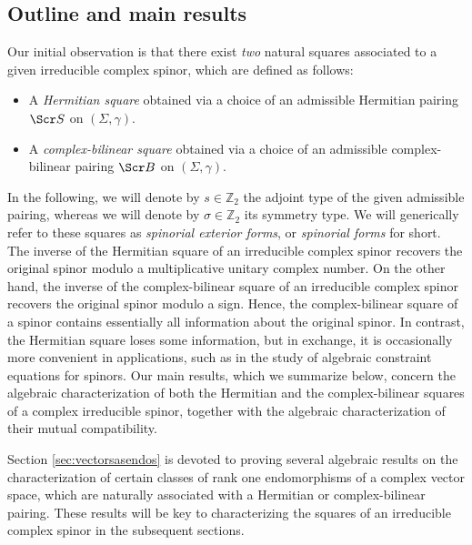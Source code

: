 \documentclass[10pt,a4paper,twoside,reqno]{amsart}
\theoremstyle{plain}
\theoremstyle{definition}
\theoremstyle{remark}
\def\scB{\Scr B}
\def\scS{\Scr S}
\begin{document}

\subsection*{Outline and main results}


Our initial observation is that there exist \emph{two} natural squares associated to a given irreducible complex spinor, which are defined as follows:
\begin{itemize}
\item A \emph{Hermitian square} obtained via a choice of an admissible Hermitian pairing $\scS$ on $(\Sigma,\gamma)$.
\item A \emph{complex-bilinear square} obtained via a choice of an admissible complex-bilinear pairing $\scB$ on $(\Sigma,\gamma)$.
\end{itemize}

\noindent
In the following, we will denote by $s\in \mathbb{Z}_2$ the adjoint type of the given admissible pairing, whereas we will denote by $\sigma\in \mathbb{Z}_2$ its symmetry type. We will generically refer to these squares as \emph{spinorial exterior forms}, or \emph{spinorial forms} for short. The inverse of the Hermitian square of an irreducible complex spinor recovers the original spinor modulo a multiplicative unitary complex number. On the other hand, the inverse of the complex-bilinear square of an irreducible complex spinor recovers the original spinor modulo a sign. Hence, the complex-bilinear square of a spinor contains essentially all information about the original spinor. In contrast, the Hermitian square loses some information, but in exchange, it is occasionally more convenient in applications, such as in the study of algebraic constraint equations for spinors. Our main results, which we summarize below, concern the algebraic characterization of both the Hermitian and the complex-bilinear squares of a complex irreducible spinor, together with the algebraic characterization of their mutual compatibility.\medskip

Section \ref{sec:vectorsasendos} is devoted to proving several algebraic results on the characterization of certain classes of rank one endomorphisms of a complex vector space, which are naturally associated with a Hermitian or complex-bilinear pairing. These results will be key to characterizing the squares of an irreducible complex spinor in the subsequent sections.\medskip
\end{document}
